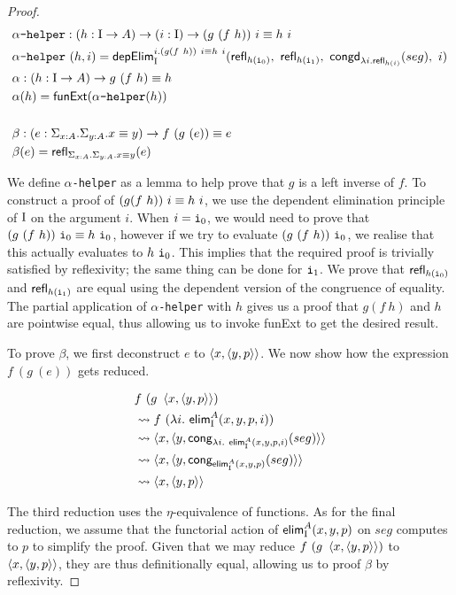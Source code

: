 \documentclass[12pt,twoside,maitrise]{dms}
\theoremstyle{definition}
\numberwithin{equation}{section}
\numberwithin{table}{chapter}
\numberwithin{figure}{chapter}
\newcommand\kw[1] {\textsf{#1}}
\newcommand\id[1] {\texttt{#1}}
\begin{document}
\begin{proof}
\begin{align*}
  & \id{$\alpha$-helper} : (\oftype{h}{\bI \rightarrow A}) \rightarrow (\oftype{i}{\bI}) \rightarrow \eqtype{(g \ (f \ h)) \ i}{h \ i} \\
  & \id{$\alpha$-helper} \ (h , i) = \kw{depElim}_{\bI}^{i.\eqtype{(g (f \ h)) \ i}{h \ i}}(\kw{refl}_{h (\ileft)}, \ \kw{refl}_{h (\iright)}, \ \kw{congd}_{\lambda i . \kw{refl}_{h(i)}}(seg), \ i) \\
  & \alpha : (\oftype{h}{\bI \rightarrow A}) \rightarrow \eqtype{g \ (f \ h)}{h} \\
  & \alpha(h) =  \kw{funExt} (\id{$\alpha$-helper} (h)) \\ \\
  & \beta :  (\oftype{e}{\Sigma_{\oftype{x}{A}} . \Sigma_{\oftype{y}{A}} . \eqtype{x}{y}}) \rightarrow f \ (g \ (e)) \equiv e \\
  & \beta(e) =  \refl{\Sigma_{\oftype{x}{A}} . \Sigma_{\oftype{y}{A}} . \eqtype{x}{y}}{e}
\end{align*}

We define \id{$\alpha$-helper} as a lemma to help prove that $g$ is a left
inverse of $f$. To construct a proof of $\eqtype{(g (f \ h)) \ i}{h \ i}$, we
use the dependent elimination principle of $\mathrm{I}$ on the argument $i$. When $i =
\ileft$, we would need to prove that $\eqtype{(g \ (f \ h)) \ \ileft}{h
  \ \ileft}$, however if we try to evaluate $(g \ (f \ h)) \ \ileft$, we realise
that this actually evaluates to $h \ \ileft$. This implies that the required
proof is trivially satisfied by reflexivity; the same thing can be done for
$\iright$. We prove that $\kw{refl}_{h (\ileft)}$ and $\kw{refl}_{h (\iright)}$
are equal using the dependent version of the congruence of equality. The partial
application of \id{$\alpha$-helper} with $h$ gives us a proof that $g(f \ h)$
and $h$ are pointwise equal, thus allowing us to invoke \kw{funExt} to get the
desired result.

To prove $\beta$, we first deconstruct $e$ to $\braket{x, \braket{y, p}}$. We
now show how the expression $f \ (g \ (e))$ gets reduced.

\begin{align*}
  & f \ (g \ \braket{x, \braket{y, p}})  \\
  & \leadsto f \ (\lambda i . \ \kw{elim}_{\bI}^{A}(x, y, p, i)) \\
  & \leadsto \braket{x, \braket{y, \kw{cong}_{\lambda i . \ \kw{elim}_{\bI}^{A}(x, y, p, i)}(seg)}} \\
  & \leadsto \braket{x, \braket{y, \kw{cong}_{\kw{elim}_{\bI}^{A}(x, y, p)}(seg)}} \\
  & \leadsto \braket{x, \braket{y, p}} \\
\end{align*}

The third reduction uses the $\eta$-equivalence of functions. As for the final
reduction, we assume that the functorial action of $\kw{elim}_{\bI}^{A}(x, y, p)$
on $seg$ computes to $p$ to simplify the proof. Given that we may reduce $f \ (g
\ \braket{x, \braket{y, p}})$ to $\braket{x, \braket{y, p}}$, they are thus
definitionally equal, allowing us to proof $\beta$ by reflexivity.\end{proof}
\end{document}
